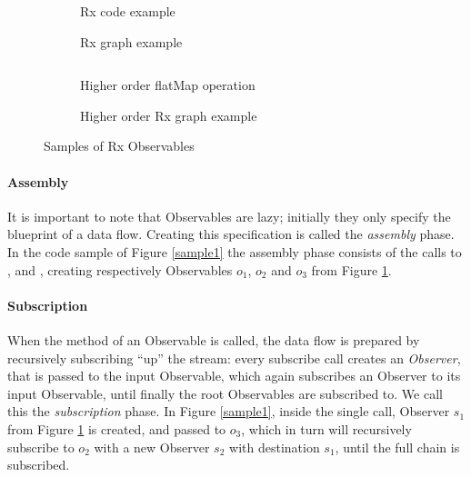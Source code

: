 \begin{figure}[ht!]
    \centering

    \begin{subfigure}[t]
        {\columnwidth} \inputminted[tabsize=2]{javascript}{listings/sample1.js}
        \par
        \bigskip
        \caption{Rx code example}%
        \label{sample1}
        \par
        \medskip
        
        \caption{Rx graph example}%
        \label{chaincreate}
    \end{subfigure}
    \begin{subfigure}[t]
        {\columnwidth} \inputminted[tabsize=2]{javascript}{listings/sample3.js}
        \caption{Higher order flatMap operation}%
        \label{sample3}
        \par
        \medskip
        
        \caption{Higher order Rx graph example}%
        \label{chainhigher}
    \end{subfigure}

    \caption{Samples of Rx Observables}

\end{figure}

\paragraph{Assembly} It is important to note that Observables are lazy;
initially they only specify the blueprint of a data flow.  Creating this
specification is called the \emph{assembly} phase.  In the code sample
of Figure%
\ref{sample1} the assembly phase consists of the calls to ,
 and , creating respectively Observables $ o_1 $,
$ o_2 $ and $ o_3 $ from Figure%
\ref{chaincreate}.

\paragraph{Subscription} When the  method of an
Observable is called, the data flow is prepared by recursively
subscribing ``up'' the stream:  every subscribe call creates an \emph{Observer},
that is passed to the input Observable, which again subscribes an
Observer to its input Observable, until finally the root Observables are
subscribed to.  We call this the \emph{subscription} phase.  In Figure%
\ref{sample1}, inside the single  call, Observer $ s_1 $
from Figure%
\ref{chaincreate} is created, and passed to $ o_3 $, which in turn will
recursively subscribe to $ o_2 $ with a new Observer $ s_2 $ with
destination $ s_1 $, until the full chain is subscribed.

